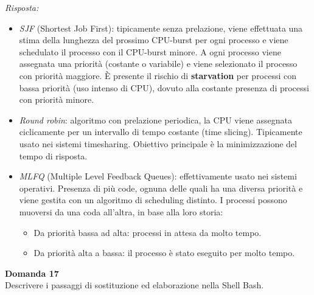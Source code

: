 \documentclass{article}
\newenvironment{problem}[2][Domanda]
    { \begin{mdframed}[backgroundcolor=gray!20] \textbf{#1 #2} \\}
    {  \end{mdframed}}
\newenvironment{solution}
    {\textit{Risposta:}}
    {}
\begin{document}
\begin{solution}
\begin{itemize}
    \item \emph{SJF} (Shortest Job First): tipicamente senza prelazione, viene effettuata una stima della lunghezza del prossimo CPU-burst per ogni processo e viene schedulato il processo con il CPU-burst minore.
    \newline
    A ogni processo viene assegnata una priorità (costante o variabile) e viene selezionato il processo con priorità maggiore.
    \newline
    È presente il rischio di \textbf{starvation} per processi con bassa priorità (uso intenso di CPU), dovuto alla costante presenza di processi con priorità minore.

    \item \emph{Round robin}: algoritmo con prelazione periodica, la CPU viene assegnata ciclicamente per un intervallo di tempo costante (time slicing).
    \newline
    Tipicamente usato nei sistemi timesharing.
    \newline
    Obiettivo principale è la minimizzazione del tempo di risposta.

    \item \emph{MLFQ} (Multiple Level Feedback Queues): effettivamente usato nei sistemi operativi.
    \newline
    Presenza di più code, ognuna delle quali ha una diversa priorità e viene gestita con un algoritmo di scheduling distinto.
    \newline
    I processi possono muoversi da una coda all’altra, in base alla loro storia:
    \begin{itemize}
        \item Da priorità bassa ad alta: processi in attesa da molto tempo.
        \item Da priorità alta a bassa: il processo è stato eseguito per molto tempo.
    \end{itemize}
\end{itemize}
\end{solution}
\begin{problem}{17}
Descrivere i passaggi di sostituzione ed elaborazione nella Shell Bash.
\end{problem}
\end{document}

